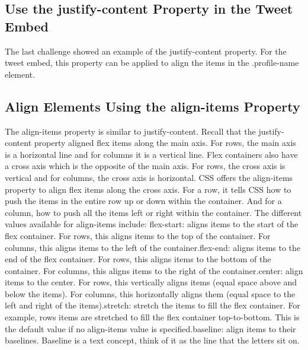 \documentclass{article}%
\begin{document}
%
\subsection{Use the justify{-}content Property in the Tweet Embed}%
\label{subsec:Usethejustify{-}contentPropertyintheTweetEmbed}%
The last challenge showed an example of the justify{-}content property. For the tweet embed, this property can be applied to align the items in the .profile{-}name element.\newline%

%
\subsection{Align Elements Using the align{-}items Property}%
\label{subsec:AlignElementsUsingthealign{-}itemsProperty}%
The align{-}items property is similar to justify{-}content. Recall that the justify{-}content property aligned flex items along the main axis. For rows, the main axis is a horizontal line and for columns it is a vertical line.\newline%
Flex containers also have a cross axis which is the opposite of the main axis. For rows, the cross axis is vertical and for columns, the cross axis is horizontal.\newline%
CSS offers the align{-}items property to align flex items along the cross axis. For a row, it tells CSS how to push the items in the entire row up or down within the container. And for a column, how to push all the items left or right within the container.\newline%
The different values available for align{-}items include:\newline%
flex{-}start: aligns items to the start of the flex container. For rows, this aligns items to the top of the container. For columns, this aligns items to the left of the container.flex{-}end: aligns items to the end of the flex container. For rows, this aligns items to the bottom of the container. For columns, this aligns items to the right of the container.center: align items to the center. For rows, this vertically aligns items (equal space above and below the items). For columns, this horizontally aligns them (equal space to the left and right of the items).stretch: stretch the items to fill the flex container. For example, rows items are stretched to fill the flex container top{-}to{-}bottom. This is the default value if no align{-}items value is specified.baseline: align items to their baselines. Baseline is a text concept, think of it as the line that the letters sit on.\newline%
\end{document}
